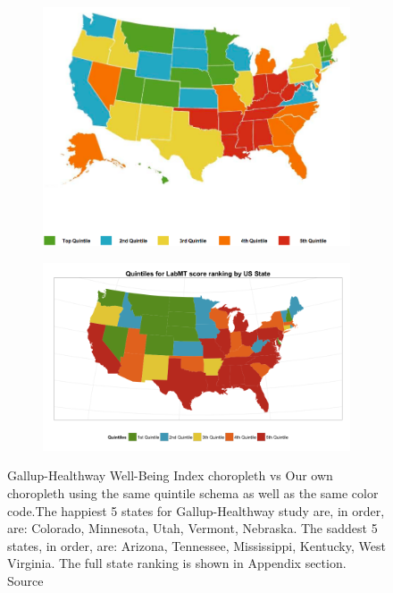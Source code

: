 \documentclass{llncs}
\begin{document}
\begin{figure}[!ht]
\begin{subfigure}[b]{\textwidth}
\centering
\includegraphics[width=\textwidth]{images/gallup_2012}
\end{subfigure}
\begin{subfigure}[b]{\textwidth}
\includegraphics[width=\textwidth]{images/scores_by_state_gallup_style}
\end{subfigure}
\caption{Gallup-Healthway Well-Being Index choropleth vs Our own choropleth using the same quintile schema as well as the same color code.The happiest 5 states for Gallup-Healthway study are, in order, are: Colorado, Minnesota, Utah, Vermont, Nebraska. The saddest 5 states, in order, are: Arizona, Tennessee, Mississippi, Kentucky, West Virginia. The full state ranking is shown in Appendix section. Source \cite{GallupHealthway2013}}
\label{fig:gallup_vs_labmt}
\end{figure}
\end{document}
